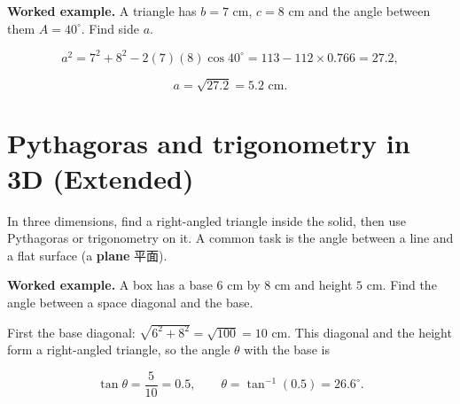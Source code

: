 \documentclass[11pt]{article}
\begin{document}
\textbf{Worked example.} A triangle has $b = 7\text{ cm}$, $c = 8\text{ cm}$ and the angle between them $A = 40^{\circ}$. Find side $a$.

\[
a^{2} = 7^{2} + 8^{2} - 2(7)(8)\cos 40^{\circ} = 113 - 112 \times 0.766 = 27.2,
\]

\[
a = \sqrt{27.2} = 5.2\text{ cm}.
\]

\section*{Pythagoras and trigonometry in 3D (Extended)}

In three dimensions, find a right-angled triangle inside the solid, then use Pythagoras or trigonometry on it. A common task is the angle between a line and a flat surface (a \textbf{plane} 平面).

\textbf{Worked example.} A box has a base $6\text{ cm}$ by $8\text{ cm}$ and height $5\text{ cm}$. Find the angle between a space diagonal and the base.

First the base diagonal: $\sqrt{6^{2} + 8^{2}} = \sqrt{100} = 10\text{ cm}$. This diagonal and the height form a right-angled triangle, so the angle $\theta$ with the base is

\[
\tan\theta = \frac{5}{10} = 0.5, \qquad \theta = \tan^{-1}(0.5) = 26.6^{\circ}.
\]
\end{document}
